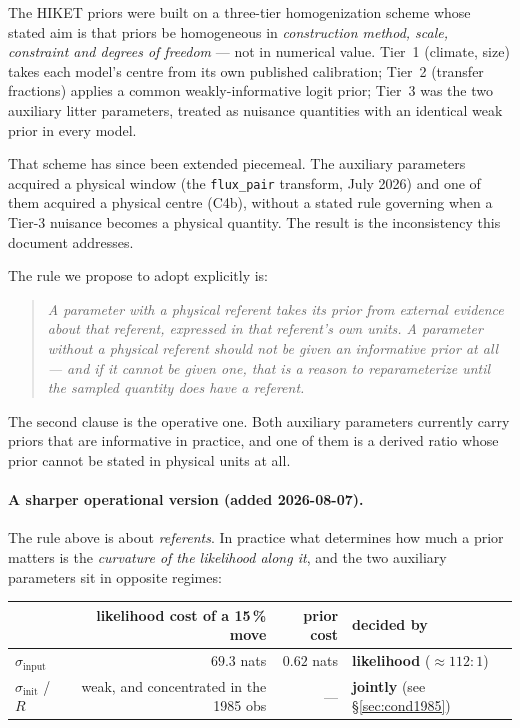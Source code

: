 \documentclass[11pt]{article}
\newcommand{\sinit}{\sigma_{\mathrm{init}}}
\newcommand{\sinput}{\sigma_{\mathrm{input}}}
\begin{document}
The HIKET priors were built on a three-tier homogenization scheme whose stated aim is that
priors be homogeneous in \emph{construction method, scale, constraint and degrees of freedom}
--- not in numerical value. Tier~1 (climate, size) takes each model's centre from its own
published calibration; Tier~2 (transfer fractions) applies a common weakly-informative logit
prior; Tier~3 was the two auxiliary litter parameters, treated as nuisance quantities with an
identical weak prior in every model.

That scheme has since been extended piecemeal. The auxiliary parameters acquired a physical
window (the \texttt{flux\_pair} transform, July 2026) and one of them acquired a physical
centre (C4b), without a stated rule governing when a Tier-3 nuisance becomes a physical
quantity. The result is the inconsistency this document addresses.

The rule we propose to adopt explicitly is:

\begin{quote}
\emph{A parameter with a physical referent takes its prior from external evidence about that
referent, expressed in that referent's own units. A parameter without a physical referent
should not be given an informative prior at all --- and if it cannot be given one, that is a
reason to reparameterize until the sampled quantity does have a referent.}
\end{quote}

The second clause is the operative one. Both auxiliary parameters currently carry priors that
are informative in practice, and one of them is a derived ratio whose prior cannot be stated in
physical units at all.

\paragraph{A sharper operational version (added 2026-08-07).} The rule above is about
\emph{referents}. In practice what determines how much a prior matters is the \emph{curvature of
the likelihood along it}, and the two auxiliary parameters sit in opposite regimes:

\begin{table}[H]\centering\small
\begin{tabular}{lrrl}
\toprule
 & likelihood cost of a 15\,\% move & prior cost & decided by\\
\midrule
$\sinput$ & $69.3$ nats & $0.62$ nats & \textbf{likelihood} ($\approx 112:1$)\\
$\sinit$ / $R$ & weak, and concentrated in the 1985 obs & --- & \textbf{jointly} (see \S\ref{sec:cond1985})\\
\bottomrule
\end{tabular}
\end{table}
\end{document}
